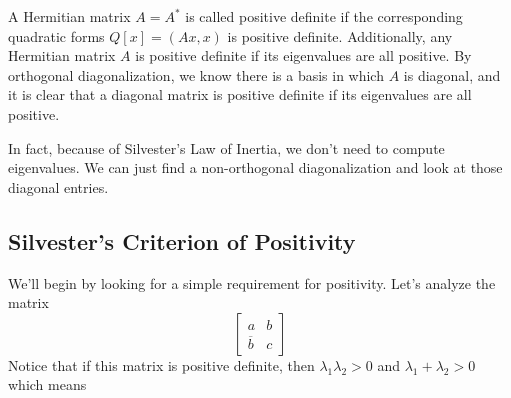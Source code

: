 A Hermitian matrix $A = A^{*}$ is called positive definite if the corresponding quadratic forms $Q[x] = (Ax, x)$ is positive definite. Additionally, any Hermitian matrix $A$ is positive definite if its eigenvalues are all positive. By orthogonal diagonalization, we know there is a basis in which $A$ is diagonal, and it is clear that a diagonal matrix is positive definite if its eigenvalues are all positive.

In fact, because of Silvester's Law of Inertia, we don't need to compute eigenvalues. We can just find a non-orthogonal diagonalization and look at those diagonal entries. 

\subsection{Silvester's Criterion of Positivity}

We'll begin by looking for a simple requirement for positivity. Let's analyze the matrix 
$$\begin{bmatrix}
a & b \\
\overline{b} & c
\end{bmatrix}$$
Notice that if this matrix is positive definite, then $\lambda_{1} \lambda_{2} > 0$ and $\lambda_{1} + \lambda_{2} > 0$ which means 
